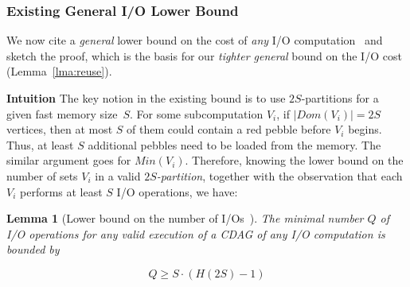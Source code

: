 \documentclass[sigplan,review,anonymous]{acmart}\settopmatter{printfolios=true,printccs=false,printacmref=false}
\newcommand\greg[1]{\textcolor{blue}{[Greg: #1]}}
\newcommand\mac[1]{\textcolor{red}{[Mac: #1]}}
\newtheorem{lma}{Lemma}
\newcommand{\macb}[1]{\textbf{\textsf{#1}}}
\begin{document}
\subsubsection{Existing General I/O Lower Bound}
\label{sec:spartProof}
%

We now cite a \emph{general} lower bound on the cost of \emph{any} I/O
computation~\cite{redblue} and sketch the proof, which is the basis for our
\emph{tighter general} bound on the I/O cost (Lemma~\ref{lma:reuse}).

\macb{Intuition}
%
The key notion in the existing bound is to use $2S$-partitions for a given fast
memory size~$S$.
%
For some subcomputation $V_i$, if $|Dom(V_i)| = 2S$ vertices, then at most $S$
of them could contain a red pebble before $V_i$ begins.  Thus, at least $S$
additional pebbles need to be loaded from the memory.  The similar argument
goes for $Min(V_i)$. Therefore, knowing the lower bound on the number of sets
$V_i$ in a valid \emph{$2S$-partition}, together with the observation that each
$V_i$ performs at least $S$ I/O operations, we have:
%
%

\begin{lma}[Lower bound on the number of I/Os~\cite{redblue}]
	The minimal number $Q$ of I/O operations for any valid execution of a CDAG 
	of
	any I/O computation is bounded by
	
	\begin{equation}
	\label{eq:redbluebound}
	Q \ge S \cdot (H(2S) - 1)
	\end{equation}
\end{lma}
\end{document}
